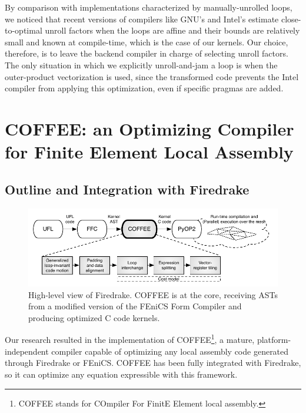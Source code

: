 By comparison with implementations characterized by manually-unrolled loops, we noticed that recent versions of compilers like GNU's and Intel's estimate close-to-optimal unroll factors when the loops are affine and their bounds are relatively small and known at compile-time, which is the case of our kernels. Our choice, therefore, is to leave the backend compiler in charge of selecting unroll factors. The only situation in which we explicitly unroll-and-jam a loop is when the outer-product vectorization is used, since the transformed code prevents the Intel compiler from applying this optimization, even if specific pragmas are added.


\section{COFFEE: an Optimizing Compiler for Finite Element Local Assembly}
\label{sec:coffee-implementation}
\subsection{Outline and Integration with Firedrake}

\begin{figure}
\begin{center}
\includegraphics[scale=0.70]{coffee/pictures/coffee-pipeline.pdf}
\caption{High-level view of Firedrake. COFFEE is at the core, receiving ASTs from a modified version of the FEniCS Form Compiler and producing optimized C code kernels.}
\label{fig:coffee-pipeline}
\end{center}
\end{figure}

Our research resulted in the implementation of COFFEE\footnote{COFFEE stands for COmpiler For FinitE Element local assembly.}, a mature, platform-independent compiler capable of optimizing any local assembly code generated through Firedrake or FEniCS. COFFEE has been fully integrated with Firedrake, so it can optimize any equation expressible with this framework.

